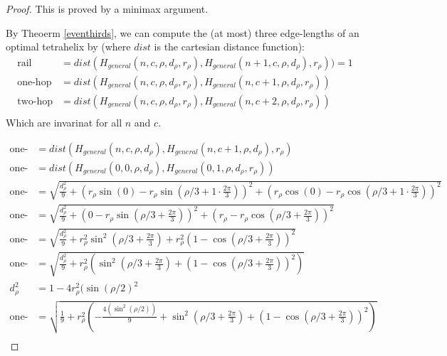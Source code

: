 \documentclass[11pt]{article}
\begin{document}
\begin{proof}
This is proved by a minimax argument.

By Theoerm \ref{eventhirds}, we can compute the (at most) three edge-lengths of an optimal
tetrahelix by (where $dist$ is the cartesian distance function):
\begin{align*}
  \text{rail} &= dist(H_{general}(n,c,\rho,d_{\rho},r_{\rho}),H_{general}(n+1,c,\rho,d_{\rho}),r_{\rho})) = 1 \\
  \text{one-hop} &= dist(H_{general}(n,c,\rho,d_{\rho},r_{\rho}),H_{general}(n,c+1,\rho,d_{\rho},r_{\rho}))  \\
  \text{two-hop} &= dist(H_{general}(n,c,\rho,d_{\rho},r_{\rho}),H_{general}(n,c+2,\rho,d_{\rho},r_{\rho}))  \\  
\end{align*}
Which are invarinat for all $n$ and $c$.

\begin{align*}
  \text{one-hop} &= dist(H_{general}(n,c,\rho,d_{\rho}),H_{general}(n,c+1,\rho,d_{\rho}),r_{\rho})  \\
  \text{one-hop} &= dist(H_{general}(0,0,\rho,d_{\rho}),H_{general}(0,1,\rho,d_{\rho},r_{\rho}))  \\  
  \text{one-hop}  &= \sqrt{\frac{d_{\rho}^2}{9} + (r_{\rho}\sin(0) - r_{\rho}\sin(\rho/3+1\cdot\frac{2\pi}{3}))^2  +
    (r_{\rho}\cos(0) - r_{\rho}\cos(\rho/3 + 1\cdot\frac{2\pi}{3}))^2} \\
  \text{one-hop}  &= \sqrt{\frac{d_{\rho}^2}{9} + (0  - r_{\rho}\sin(\rho/3 + \frac{2\pi}{3}))^2  +
    (r_{\rho} - r_{\rho}\cos(\rho/3 + \frac{2\pi}{3}))^2} \\
  \text{one-hop}  &= \sqrt{\frac{d_{\rho}^2}{9} + r_{\rho}^2\sin^2(\rho/3 + \frac{2\pi}{3})  +
    r_{\rho}^2(1 - \cos(\rho/3 + \frac{2\pi}{3}))^2} \\
  \text{one-hop}  &= \sqrt{\frac{d_{\rho}^2}{9} + r_{\rho}^2(\sin^2(\rho/3 + \frac{2\pi}{3})  + (1 - \cos(\rho/3 + \frac{2\pi}{3}))^2)} \\
  d_{\rho}^2 &= 1 - 4 r_{\rho}^2 (\sin( \rho / 2)^2 \\
  \text{one-hop}  &= \sqrt{\frac{1}{9}  + r_{\rho}^2(-\frac{4 (\sin^2( \rho / 2))}{9} + \sin^2(\rho/3+ \frac{2\pi}{3})  + (1 - \cos(\rho/3 + \frac{2\pi}{3}))^2)} \\
\end{align*}


\end{proof}
\end{document}
